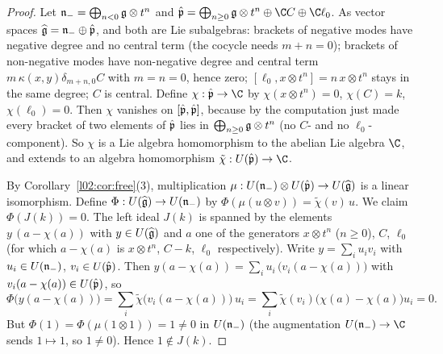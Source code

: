 \begin{proof}
Let $\mathfrak{n}_- = \bigoplus_{n<0}\mathfrak{g}\otimes t^n$ and $\hat{\ltwop} = \bigoplus_{n\ge0}\ltwog\otimes t^n
\oplus\C C\oplus\C\ell_0$. As vector spaces $\widehat{\mathfrak{g}} = \mathfrak{n}_-\oplus\hat{\mathfrak{p}}$, and both are Lie
subalgebras: brackets of negative modes have negative degree and no central term (the cocycle needs
$m+n=0$); brackets of non-negative modes have non-negative degree and central term
$m\,\kappa(x,y)\delta_{m+n,0}C$ with $m=n=0$, hence zero; $[\ell_0, x\otimes t^n] = n\,x\otimes t^n$ stays
in the same degree; $C$ is central. Define $\chi:\hat{\ltwop}\to\C$ by $\chi(x\otimes t^n) = 0$,
$\chi(C) = k$, $\chi(\ell_0) = 0$. Then $\chi$ vanishes on $[\hat{\mathfrak{p}},\hat{\mathfrak{p}}]$, because by the
computation just made every bracket of two elements of $\hat{\mathfrak{p}}$ lies in $\bigoplus_{n\ge0}\mathfrak{g}\otimes
t^n$ (no $C$- and no $\ell_0$-component). So $\chi$ is a Lie algebra homomorphism to the abelian Lie
algebra $\C$, and extends to an algebra homomorphism $\tilde\chi : U(\hat{\ltwop})\to\C$.

By Corollary~\ref{l02:cor:free}(3), multiplication $\mu: U(\mathfrak{n}_-)\otimes U(\hat{\mathfrak{p}})\to U(\widehat{\mathfrak{g}})$ is
a linear isomorphism. Define $\Phi : U(\widehat{\mathfrak{g}})\to U(\mathfrak{n}_-)$ by $\Phi(\mu(u\otimes v)) =
\tilde\chi(v)\,u$. We claim $\Phi(J(k)) = 0$. The left ideal $J(k)$ is spanned by the elements
$y\,(a-\chi(a))$ with $y\in U(\widehat{\mathfrak{g}})$ and $a$ one of the generators $x\otimes t^n$ ($n\ge0$), $C$,
$\ell_0$ (for which $a - \chi(a)$ is $x\otimes t^n$, $C-k$, $\ell_0$ respectively). Write
$y = \sum_i u_iv_i$ with $u_i\in U(\mathfrak{n}_-)$, $v_i\in U(\hat{\mathfrak{p}})$. Then
$y(a-\chi(a)) = \sum_i u_i\,\bigl(v_i(a-\chi(a))\bigr)$ with $v_i(a-\chi(a))\in U(\hat{\mathfrak{p}})$, so
\begin{equation*}
 \Phi\bigl(y(a-\chi(a))\bigr) = \sum_i\tilde\chi\bigl(v_i(a-\chi(a))\bigr)\,u_i =
 \sum_i\tilde\chi(v_i)\bigl(\chi(a)-\chi(a)\bigr)u_i = 0.
\end{equation*}
But $\Phi(1) = \Phi(\mu(1\otimes1)) = 1\ne0$ in $U(\mathfrak{n}_-)$ (the augmentation $U(\ltwon_-)\to\C$ sends
$1\mapsto1$, so $1\ne0$). Hence $1\notin J(k)$.
\end{proof}

